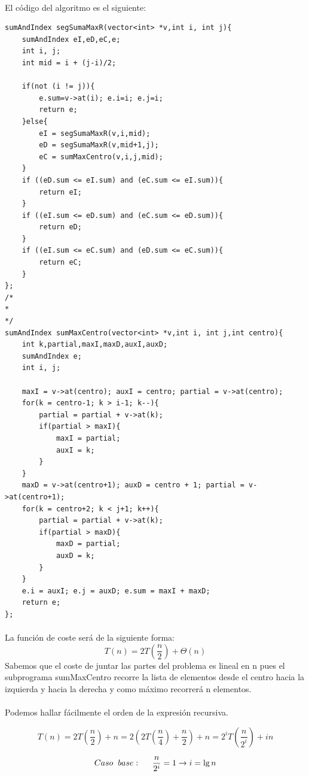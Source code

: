 \documentclass[es]{ifirak}
\begin{document}
\paragraph{}
El código del algoritmo es el siguiente:
\begin{lstlisting}
sumAndIndex segSumaMaxR(vector<int> *v,int i, int j){
	sumAndIndex eI,eD,eC,e;
	int i, j;
	int mid = i + (j-i)/2;
	
	if(not (i != j)){
		e.sum=v->at(i); e.i=i; e.j=i;
		return e;
	}else{
		eI = segSumaMaxR(v,i,mid);
		eD = segSumaMaxR(v,mid+1,j);
		eC = sumMaxCentro(v,i,j,mid);
	}
	if ((eD.sum <= eI.sum) and (eC.sum <= eI.sum)){
		return eI;
	}
	if ((eI.sum <= eD.sum) and (eC.sum <= eD.sum)){
		return eD;
	}
	if ((eI.sum <= eC.sum) and (eD.sum <= eC.sum)){
		return eC;
	}
};
/*
*
*/
sumAndIndex sumMaxCentro(vector<int> *v,int i, int j,int centro){
	int k,partial,maxI,maxD,auxI,auxD;
	sumAndIndex e;
	int i, j;
	
	maxI = v->at(centro); auxI = centro; partial = v->at(centro);
	for(k = centro-1; k > i-1; k--){
		partial = partial + v->at(k);
		if(partial > maxI){
			maxI = partial;
			auxI = k;
		}
	}
	maxD = v->at(centro+1); auxD = centro + 1; partial = v->at(centro+1);
	for(k = centro+2; k < j+1; k++){
		partial = partial + v->at(k);
		if(partial > maxD){
			maxD = partial;
			auxD = k;
		}
	}
	e.i = auxI; e.j = auxD; e.sum = maxI + maxD;
	return e;
};
\end{lstlisting}
\paragraph{}
La función de coste será de la siguiente forma:
$$T(n)=2T(\frac{n}{2}) + \Theta(n)$$
Sabemos que el coste de juntar las partes del problema es lineal en n pues el subprograma sumMaxCentro recorre la lista de elementos desde el centro hacia la izquierda y hacia la derecha y como máximo recorrerá n elementos.

\paragraph{}
Podemos hallar fácilmente el orden de la expresión recursiva.

$$T(n)=2T(\frac{n}{2}) + n = 2(2T(\frac{n}{4}) + \frac{n}{2})+n = 2^{i}T( \frac{n}{2^{i}}) + in$$


$$Caso \hspace{0.2cm} base: \hspace{0.5cm} \frac{n}{2^{i}} = 1 \rightarrow i = \lg n$$
\end{document}
